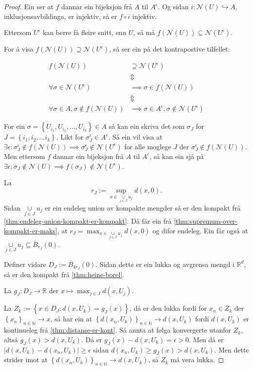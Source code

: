 \documentclass[a4paper, 12pt, norsk]{article}
\theoremstyle{plain}
\theoremstyle{definition}
\newcommand{\Rb}{\mathbb{R}}
\newcommand{\Nb}{\mathbb{N}}
\newcommand{\Nc}{\mathcal{N}}
\newcommand{\union}{ \mathop{\cup}\limits }
\newcommand{\set}[1]{ \left\{ #1 \right\} } %
\begin{document}
\begin{proof}
	 Ein ser at \( f \) dannar ein bijeksjon frå \( A \) til \( A^\epsilon \). Og sidan \( i: \Nc(U) \hookrightarrow A \), inklusjonsavbildinga, er injektiv, så er \( f \circ i \) injektiv.

	Ettersom \( U^{\epsilon} \) kan berre få fleire snitt, enn \( U \), så må \( f(\Nc(U)) \subseteq \Nc(U^{\epsilon}) \).
	
	For å visa \( f(\Nc(U)) \supseteq \Nc(U^{\epsilon}) \), så ser ein på det kontrapostive tilfellet:
	 
	\begin{align*}
		f(\Nc(U)) &\supseteq \Nc(U^{\epsilon}) \\
		&\Updownarrow \\ 
		\forall \sigma \in \Nc(U^{\epsilon}) &\implies \sigma \in f(\Nc(U)) \\
		&\Updownarrow \\
		\forall \sigma \in A, \sigma \not\in f(\Nc(U)) &\implies \sigma \in A^\epsilon, \sigma \not\in \Nc(U^{\epsilon})
	\end{align*}

	For ein \( \sigma = \set{U_{i_1}, U_{i_2}, \dots, U_{i_k}} \in A \) så kan ein skriva det som \( \sigma_J \) for \( J = \set{i_1, i_2, \dots i_k} \). Likt for \( \sigma^\epsilon_J \in A^\epsilon \). Så ein vil visa at \( \exists \epsilon : \sigma^\epsilon_J \not\in f(\Nc(U)) \implies \sigma^\epsilon_J \not\in \Nc(U^{\epsilon}) \) for alle moglege \( J \) der \( \sigma^\epsilon_J \not\in f(\Nc(U)) \). Men ettersom \( f \) dannar ein bijeksjon frå \( A \) til \( A^\epsilon \), så kan ein sjå på \( \exists \epsilon : \sigma_J \not\in \Nc(U) \implies f(\sigma_J) \not\in \Nc(U^{\epsilon}) \).

	La
	\[
		r_J := \sup_{x \in \union_{j \in J} u_j} d(x,0).
	\]
	Sidan \( \union_{j \in J} u_j \) er ein endeleg union av kompakte mengder så er den kompakt frå \autoref{thm:endeleg-union-kompakt-er-kompakt}. Då får ein frå \autoref{thm:supremum-over-kompakt-er-maks}, at \( r_J = \max_{x \in \union_{j \in J} u_j} d(x,0) \) og difor endeleg. Ein får også at \( \union_{j \in J} u_j \subseteq \bar{B}_{r_J}(0) \).
	
	Definer vidare \( D_J := \bar{B}_{4r_J}(0) \). Sidan dette er ein lukka og avgrensa mengd i \( \Rb^d \), så er den kompakt frå \autoref{thm:heine-borel}.

	La \( g_J: D_J \to \Rb \) der \( x \mapsto \max_{j \in J} d(x, U_j) \). 
	
	La \( Z_k := \set{x \in D_J: d(x, U_k) = g_J(x)} \), då er den lukka fordi for \( x_n \in Z_k \) der \( \set{x_n}_{n\in\Nb} \to x \), så har ein at \( \set{d(x_n, U_k)}_{n\in\Nb} \to d(x, U_k) \) fordi \( d(x, U_k) \) er kontinueleg frå \autoref{thm:distanse-er-kont}. Så annta at følga konvergerte utanfor \( Z_k \), altså \( g_J(x) > d(x, U_k) \). Då er \( g_J(x)-d(x, U_k) = \epsilon > 0 \). Men då er \( |d(x, U_k)-d(x_n, U_k)| \geq \epsilon \) sidan \( d(x_n, U_k) \geq g_J(x) > d(x, U_k) \). Men dette strider imot at \( \set{d(x_n, U_k)}_{n\in\Nb} \to d(x, U_k) \), så \( Z_k \) må vera lukka.
	

\end{proof}
\end{document}
